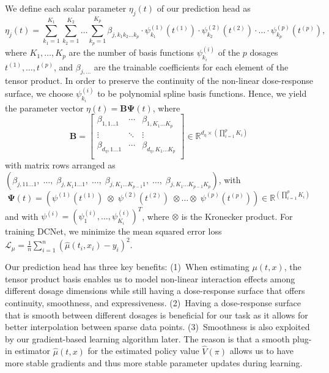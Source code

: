 \documentclass{article}
\theoremstyle{definition}
\theoremstyle{plain}
\begin{document}
We define each scalar parameter $\eta_j(t)$ of our prediction head as
\begin{equation}
    \eta_j(t) = \sum_{k_1=1}^{K_1}\sum_{k_2=1}^{K_2} \dots \sum_{k_p=1}^{K_p}\beta_{j, k_1 k_2\dots k_p}\cdot \psi_{k_1}^{(1)}(t^{(1)}) \cdot \psi_{k_2}^{(2)}(t^{(2)}) \cdot \ldots \cdot \psi_{k_p}^{(p)}(t^{(p)}),
\end{equation}
where $K_1, \dots, K_p$ are the number of basis functions $\psi_{k_i}^{(i)}$ of the $p$ dosages $t^{(1)}, \dots, t^{(p)}$, and $\beta_{j, \dots}$ are the trainable coefficients for each element of the tensor product.  In order to preserve the continuity of the non-linear dose-response surface, we choose $\psi_{k_i}^{(i)}$ to be polynomial spline basis functions. Hence, we yield the parameter vector 
$\eta(t) = \mathbf{B}  \mathbf{\Psi}(t)$, where
\begin{equation}
    \left.\mathbf{B} = \begin{bmatrix}
    \beta_{1, 1\dots 1} & \cdots & \beta_{1, K_1 \dots K_p} \\
    \vdots & \ddots & \vdots \\
     \beta_{d_{\eta}, 1 \dots 1} & \cdots & \beta_{d_{\eta},K_1 \dots K_p} \\
\end{bmatrix} \in \mathbb{R}^{d_{\eta} \times (\prod_{i=1}^{p}K_i)}\right.
\end{equation}
with matrix rows arranged as $(\beta_{j, 1 1\dots 1}, \; \dots , \; \beta_{j, K_1 1 \dots 1}, \; \dots, \;  \beta_{j, K_1 \dots K_{p-1} 1}, \; \dots , \;\beta_{j, K_1\dots K_{p-1} K_p})$, with 
\begin{equation}
    \left.\mathbf{\Psi}(t) =  \left(\psi^{(1)}(t^{(1)}) \; \otimes \; \psi^{(2)}(t^{(2)}) \; \otimes \dots \otimes \; \psi^{(p)}(t^{(p)})\right) \in \mathbb{R}^{(\prod_{i=1}^{p}K_i)} \right.
\end{equation}
and with $\left.\psi^{(i)} = (\psi^{(i)}_1, \dots, \psi^{(i)}_{K_i})^T \right.$, where $\otimes$ is the Kronecker product. For training DCNet, we minimize the mean squared error loss 
    $\mathcal{L}_{\mu}=\frac{1}{n}\sum_{i=1}^n \left( \hat{\mu}(t_i, x_i) - y_i \right)^2.$


Our prediction head has three key benefits: (1)~When estimating $\mu(t, x)$, the tensor product basis enables us to model non-linear interaction effects among different dosage dimensions while still having a dose-response surface that offers continuity, smoothness, and expressiveness. (2)~Having a dose-response surface that is smooth between different dosages is beneficial for our task as it allows for better interpolation between sparse data points. (3)~Smoothness is also exploited by our gradient-based learning algorithm later. The reason is that a smooth plug-in estimator $\hat{\mu}(t, x)$ for the estimated policy value $\hat{V}(\pi)$ allows us to have more stable gradients and thus more stable parameter updates during learning.
\end{document}
